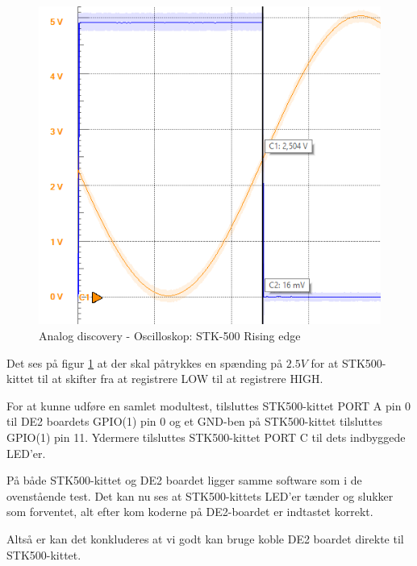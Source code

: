 \begin{figure}[h]
	\centering
	\includegraphics[scale=0.7, trim=0 0 0 0, clip=true]{../Implementering/billeder/STK_RISING.png}
	\caption{Analog discovery - Oscilloskop: STK-500 Rising edge}
	\label{fig:STK_RISING}
\end{figure}

Det ses på figur \ref{fig:STK_RISING} at der skal påtrykkes en spænding på $2.5V$ for at STK500-kittet til at skifter fra at registrere LOW til at registrere HIGH.





For at kunne udføre en samlet modultest, tilsluttes STK500-kittet PORT A pin 0 til DE2 boardets GPIO(1) pin 0 og et GND-ben på STK500-kittet tilsluttes GPIO(1) pin 11. Ydermere tilsluttes STK500-kittet PORT C til dets indbyggede LED'er.

På både STK500-kittet og DE2 boardet ligger samme software som i de ovenstående test. Det kan nu ses at STK500-kittets LED'er tænder og slukker som forventet, alt efter kom koderne på DE2-boardet er indtastet korrekt.

Altså er kan det konkluderes at vi godt kan bruge koble DE2 boardet direkte til STK500-kittet.